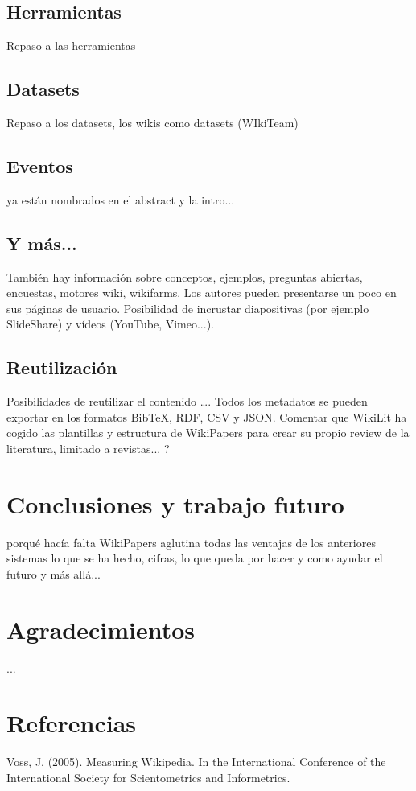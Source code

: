 \documentclass[11pt,twocolumn]{article}
\begin{document}
\subsection{Herramientas}
Repaso a las herramientas

\subsection{Datasets}
Repaso a los datasets, los wikis como datasets (WIkiTeam)

\subsection{Eventos}
ya están nombrados en el abstract y la intro...

\subsection{Y más...}
También hay información sobre conceptos, ejemplos, preguntas abiertas, encuestas, motores wiki, wikifarms.
Los autores pueden presentarse un poco en sus páginas de usuario.
Posibilidad de incrustar diapositivas (por ejemplo SlideShare) y vídeos (YouTube, Vimeo...).

\subsection{Reutilización}
Posibilidades de reutilizar el contenido ….
Todos los metadatos se pueden exportar en los formatos BibTeX, RDF, CSV y JSON.
Comentar que WikiLit ha cogido las plantillas y estructura de WikiPapers para crear su propio review de la literatura, limitado a revistas... ?

\section{Conclusiones y trabajo futuro}
porqué hacía falta WikiPapers
aglutina todas las ventajas de los anteriores sistemas
lo que se ha hecho, cifras,
lo que queda por hacer y como ayudar
el futuro y más allá...

\section{Agradecimientos}
...

\section{Referencias}
Voss, J. (2005). Measuring Wikipedia. In the International Conference of the International Society for Scientometrics and Informetrics.
\end{document}
